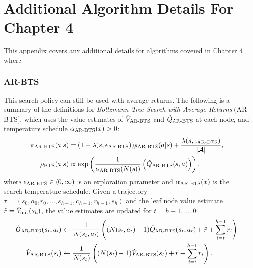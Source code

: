 %

\chapter{\label{app:ar-algs}\label{app:algo-deets-ch4}Additional Algorithm Details For Chapter 4}


This appendix covers any additional details for algorithms covered in Chapter 4 where 




\subsection{AR-BTS} 
\label{appsec:arbts}



    This search policy can still be used with average returns. The following is a summary of the definitions for \textit{Boltzmann Tree Search with Average Returns} (AR-BTS), which uses the value estimates of ${\hat{V}_{{\textnormal{AR-BTS}}}}$ and ${\hat{Q}_{{\textnormal{AR-BTS}}}}$ at each node, and temperature schedule ${\alpha_{{\textnormal{AR-BTS}}}}(x) > 0$:
    \begin{align}
        {\pi_{{\textnormal{AR-BTS}}}}(a|s) &= (1-{\lambda(s,{\epsilon_{{\textnormal{AR-BTS}}}})}){\rho_{{\textnormal{AR-BTS}}}}(a|s) + \frac{{\lambda(s,{\epsilon_{{\textnormal{AR-BTS}}}})}}{|\mathcal{A}|}, 
                    \label{eq:arbts_search_policy} \\ 
        {\rho_{{\textnormal{BTS}}}}(a|s) &\propto \exp\left(\frac{1}{{\alpha_{{\textnormal{AR-BTS}}}}(N(s))}\left({\hat{Q}_{{\textnormal{AR-BTS}}}}(s,a)\right)\right).
                    \label{eq:arbts_value_policy}
    \end{align}
    where ${\epsilon_{{\textnormal{AR-BTS}}}} \in (0,\infty)$ is an exploration parameter and ${\alpha_{{\textnormal{AR-BTS}}}}(x)$ is the search temperature schedule. Given a trajectory $\tau=(s_0,a_0,r_0,...,s_{h-1},a_{h-1},r_{h-1},s_h)$ and the leaf node value estimate $\tilde{r} = {\hat{V}_{\textnormal{init}}}(s_h)$, the value estimates are updated for $t=h-1,...,0$:
    \begin{align}
        {\hat{Q}_{{\textnormal{AR-BTS}}}}(s_t,a_t) &\leftarrow 
            \frac{1}{N(s_t,a_t)} \left( (N(s_t,a_t)-1) {\hat{Q}_{{\textnormal{AR-BTS}}}}(s_t,a_t) 
                + \tilde{r} + \sum_{i=t}^{h-1} r_i \right) \label{eq:4:arbts_backup_q} \\
        {\hat{V}_{{\textnormal{AR-BTS}}}}(s_t) &\leftarrow 
            \frac{1}{N(s_t)} \left( (N(s_t)-1) {\hat{V}_{{\textnormal{AR-BTS}}}}(s_t) 
                + \tilde{r} + \sum_{i=t}^{h-1} r_i \right). \label{eq:4:arbsts_backup_v} 
    \end{align}

